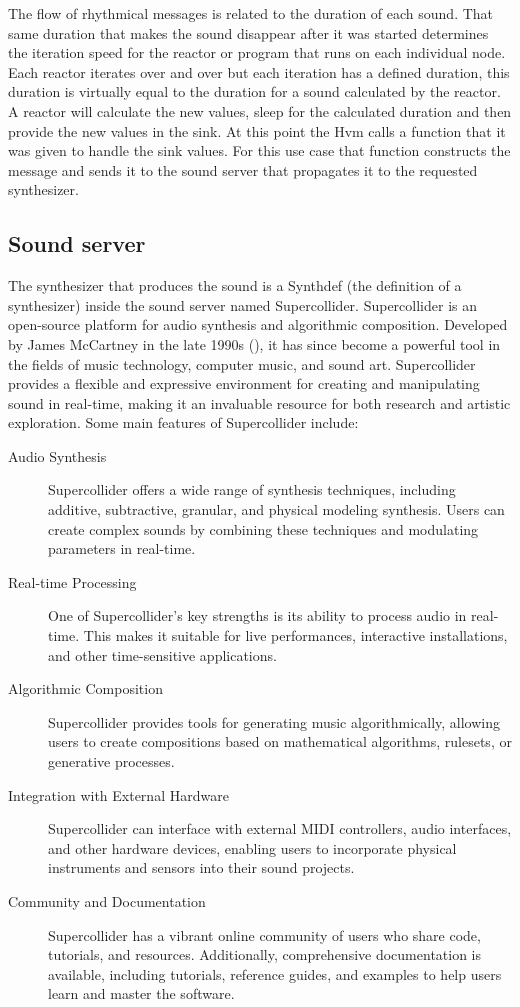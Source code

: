\documentclass[a4paper]{book}
\begin{document}
The flow of rhythmical messages is related to the duration of each sound. That same duration that makes the sound disappear after it was started determines the iteration speed for the reactor or program that runs on each individual node. Each reactor iterates over and over but each iteration has a defined duration, this duration is virtually equal to the duration for a sound calculated by the reactor. A reactor will calculate the new values, sleep for the calculated duration and then provide the new values in the sink. At this point the Hvm calls a function that it was given to handle the sink values. For this use case that function constructs the message and sends it to the sound server that propagates it to the requested synthesizer. 

\subsection{Sound server}
The synthesizer that produces the sound is a Synthdef (the definition of a synthesizer) inside the sound server named Supercollider. Supercollider is an open-source platform for audio synthesis and algorithmic composition. Developed by James McCartney in the late 1990s (\cite{scBook}), it has since become a powerful tool in the fields of music technology, computer music, and sound art. Supercollider provides a flexible and expressive environment for creating and manipulating sound in real-time, making it an invaluable resource for both research and artistic exploration. Some main features of Supercollider include:

\begin{description}
	\item[Audio Synthesis] Supercollider offers a wide range of synthesis techniques, including additive, subtractive, granular, and physical modeling synthesis. Users can create complex sounds by combining these techniques and modulating parameters in real-time.
	\item[Real-time Processing] One of Supercollider's key strengths is its ability to process audio in real-time. This makes it suitable for live performances, interactive installations, and other time-sensitive applications.
	\item[Algorithmic Composition] Supercollider provides tools for generating music algorithmically, allowing users to create compositions based on mathematical algorithms, rulesets, or generative processes.
	\item[Integration with External Hardware] Supercollider can interface with external MIDI controllers, audio interfaces, and other hardware devices, enabling users to incorporate physical instruments and sensors into their sound projects.
	\item[Community and Documentation] Supercollider has a vibrant online community of users who share code, tutorials, and resources. Additionally, comprehensive documentation is available, including tutorials, reference guides, and examples to help users learn and master the software.
	
	
\end{description}
\end{document}
